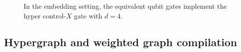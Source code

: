 \documentclass[aps,%
twocolumn,%
floatfix,%
pra,%
amsfonts,%
longbibliography,%
groupedaddress,%
superscriptaddress]{revtex4-2}%
\newcommand{\1}{\mathbbm{1}}
\begin{document}
\begin{figure}[!htbp]

    \caption{ In the embedding setting, the equivalent qubit gates implement the hyper control-\(X\) gate with \(d = 4\).}
    \label{fig:comp_1}
\end{figure}


\subsection{Hypergraph and weighted graph compilation}
\end{document}
